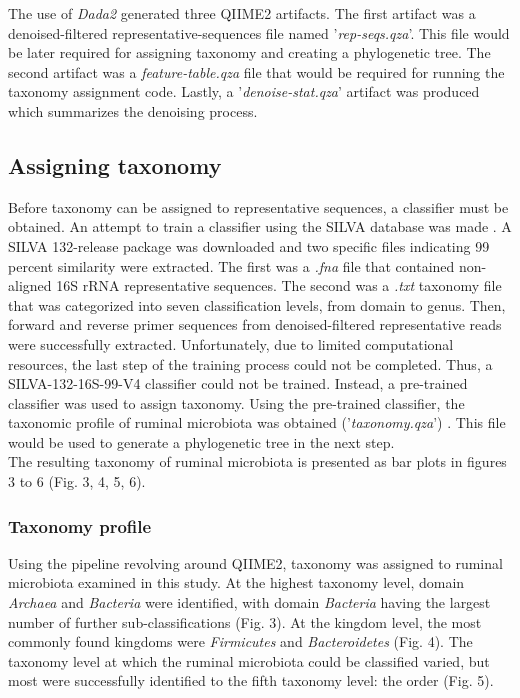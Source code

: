 \documentclass{singlecol-new}
\theoremstyle{TH}{
\newtheorem{lemma}{Lemma}
\newtheorem{theorem}[lemma]{Theorem}
\newtheorem{corrolary}[lemma]{Corrolary}
\newtheorem{conjecture}[lemma]{Conjecture}
\newtheorem{proposition}[lemma]{Proposition}
\newtheorem{claim}[lemma]{Claim}
\newtheorem{stheorem}[lemma]{Wrong Theorem}
\newtheorem{algorithm}{Algorithm}
}
\theoremstyle{THrm}{
\newtheorem{definition}{Definition}[section]
\newtheorem{question}{Question}[section]
\newtheorem{remark}{Remark}
\newtheorem{scheme}{Scheme}
}
\theoremstyle{THhit}{
\newtheorem{case}{Case}[section]
}
\begin{document}
The use of \textit{Dada2} generated three QIIME2 artifacts. The first artifact was a denoised-filtered representative-sequences file named '\textit{rep-seqs.qza}'. This file would be later required for assigning taxonomy and creating a phylogenetic tree. The second artifact was a \textit{feature-table.qza} file that would be required for running the taxonomy assignment code. Lastly, a '\textit{denoise-stat.qza}' artifact was produced which summarizes the denoising process. \\

\subsection{Assigning taxonomy}

Before taxonomy can be assigned to representative sequences, a classifier must be obtained. An attempt to train a classifier using the SILVA database was made \citep{quast2012silva}. A SILVA 132-release package was downloaded and two specific files indicating 99 percent similarity were extracted. The first was a \textit{.fna} file that contained non-aligned 16S rRNA representative sequences. The second was a \textit{.txt} taxonomy file that was categorized into seven classification levels, from domain to genus. Then, forward and reverse primer sequences from denoised-filtered representative reads were successfully extracted. Unfortunately, due to limited computational resources, the last step of the training process could not be completed. Thus, a SILVA-132-16S-99-V4 classifier could not be trained. Instead, a pre-trained classifier was used to assign taxonomy. Using the pre-trained classifier, the taxonomic profile of ruminal microbiota was obtained ('\textit{taxonomy.qza}') . This file would be used to generate a phylogenetic tree in the next step. \\

The resulting taxonomy of ruminal microbiota is presented as bar plots in figures 3 to 6 (Fig. 3, 4, 5, 6).

\subsubsection{Taxonomy profile}

Using the pipeline revolving around QIIME2, taxonomy was assigned to ruminal microbiota examined in this study. At the highest taxonomy level, domain \textit{Archaea} and \textit{Bacteria} were identified, with domain \textit{Bacteria} having the largest number of further sub-classifications (Fig. 3). At the kingdom level, the most commonly found kingdoms were \textit{Firmicutes} and \textit{Bacteroidetes} (Fig. 4). The taxonomy level at which the ruminal microbiota could be classified varied, but most were successfully identified to the fifth taxonomy level: the order (Fig. 5). 
\end{document}
